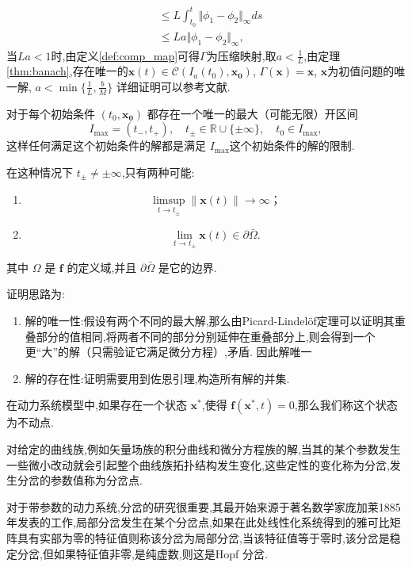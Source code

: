 \begin{pf}
\begin{equation}
\begin{aligned}
                                                             & \leq L\int_{t_0}^t\Vert \phi_1-\phi_2\Vert_{\infty} ds                             \\
                                                             & \leq La\Vert \phi_1-\phi_2\Vert_{\infty},
        \end{aligned}
    \end{equation}
    当$La<1$时,由定义\ref{def:comp_map}可得$\Gamma$为压缩映射,取$a<\frac{1}{L}$,由定理\ref{thm:banach},存在唯一的$\mathbf{x}(t)\in \mathcal{C}(I_a(t_0),\mathbf{x_0})$, $\Gamma(\mathbf{x})=\mathbf{x}$, $\mathbf{x}$为初值问题的唯一解, $a<\min\{\frac{1}{L},\frac{b}{M}\}$
    详细证明可以参考文献\cite{murray2013existence}. 
\end{pf}
\begin{rem}\label{rem:P-L}
    对于每个初始条件 $(t_0, \mathbf{x_0})$ 都存在一个唯一的最大（可能无限）开区间
    $$I_{\text{max}} = (t_{-}, t_{+}), \quad t_{\pm} \in \mathbb{R} \cup \{\pm \infty\}, \quad t_0 \in I_{\text{max}}, $$
    这样任何满足这个初始条件的解都是满足 $I_{\text{max}}$这个初始条件的解的限制. 

    在这种情况下 $t_{\pm} \neq \pm \infty$,只有两种可能:
    \begin{enumerate}
        \item $$\limsup_{t \to t_{\pm}} \|\mathbf{x}(t)\| \to \infty；$$
        \item $$\lim_{t \to t_{\pm}} \mathbf{x}(t) \in \partial \bar{\Omega}.$$
    \end{enumerate}
    其中 $\Omega$ 是 $\mathbf{f}$ 的定义域,并且 $\partial \bar{\Omega}$ 是它的边界. 
\end{rem}
\begin{pf}
    证明思路为:
    \begin{enumerate}
        \item 解的唯一性:假设有两个不同的最大解,那么由Picard-Lindelöf定理可以证明其重叠部分的值相同,将两者不同的部分分别延伸在重叠部分上,则会得到一个更“大”的解（只需验证它满足微分方程）,矛盾. 因此解唯一
        \item 解的存在性:证明需要用到佐恩引理,构造所有解的并集. 
    \end{enumerate}
\end{pf}

\begin{defn}[不动点]\cite{strogatz2018nonlinear}
    在动力系统模型中,如果存在一个状态 $\mathbf{x}^*$,使得 $\mathbf{f}(\mathbf{x}^*, t) = 0$,那么我们称这个状态为不动点. 
\end{defn}
\begin{defn}[分岔]\cite{strogatz2018nonlinear}
    对给定的曲线族,例如矢量场族的积分曲线和微分方程族的解,当其的某个参数发生一些微小改动就会引起整个曲线族拓扑结构发生变化,这些定性的变化称为分岔,发生分岔的参数值称为分岔点. 
\end{defn}
对于带参数的动力系统,分岔的研究很重要,其最开始来源于著名数学家庞加莱1885年发表的工作,局部分岔发生在某个分岔点,如果在此处线性化系统得到的雅可比矩阵具有实部为零的特征值则称该分岔为局部分岔,当该特征值等于零时,该分岔是稳定分岔,但如果特征值非零,是纯虚数,则这是Hopf 分岔\cite{enwiki:1216903952}. 

